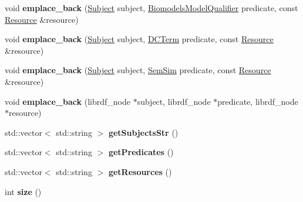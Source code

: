 \begin{DoxyCompactItemize}
\item 
\mbox{\label{classsemsim_1_1Triples_a7a7839f22cac425a78e6b4c95fa7d423}} 
void {\bfseries emplace\+\_\+back} (\hyperlink{classsemsim_1_1Subject}{Subject} subject, \hyperlink{classsemsim_1_1BiomodelsModelQualifier}{Biomodels\+Model\+Qualifier} predicate, const \hyperlink{classsemsim_1_1Resource}{Resource} \&resource)
\item 
\mbox{\label{classsemsim_1_1Triples_a83049cf0e93d420a318bd041ec5410fb}} 
void {\bfseries emplace\+\_\+back} (\hyperlink{classsemsim_1_1Subject}{Subject} subject, \hyperlink{classsemsim_1_1DCTerm}{D\+C\+Term} predicate, const \hyperlink{classsemsim_1_1Resource}{Resource} \&resource)
\item 
\mbox{\label{classsemsim_1_1Triples_aceaa9df401907b19d286ae8be29a4ed1}} 
void {\bfseries emplace\+\_\+back} (\hyperlink{classsemsim_1_1Subject}{Subject} subject, \hyperlink{classsemsim_1_1SemSim}{Sem\+Sim} predicate, const \hyperlink{classsemsim_1_1Resource}{Resource} \&resource)
\item 
\mbox{\label{classsemsim_1_1Triples_a0cdb24ded3d2c8bcec95a41cfd8f14ec}} 
void {\bfseries emplace\+\_\+back} (librdf\+\_\+node $\ast$subject, librdf\+\_\+node $\ast$predicate, librdf\+\_\+node $\ast$resource)
\item 
\mbox{\label{classsemsim_1_1Triples_a95177537847688d33f83302a65767982}} 
std\+::vector$<$ std\+::string $>$ {\bfseries get\+Subjects\+Str} ()
\item 
\mbox{\label{classsemsim_1_1Triples_aa51480fb718cd5b47a2c96fc99a10c2c}} 
std\+::vector$<$ std\+::string $>$ {\bfseries get\+Predicates} ()
\item 
\mbox{\label{classsemsim_1_1Triples_ae4e47c0881214aec04987fada026f9ae}} 
std\+::vector$<$ std\+::string $>$ {\bfseries get\+Resources} ()
\item 
\mbox{\label{classsemsim_1_1Triples_a9787be0290ba6519cc4f71b28ce280f6}} 
int {\bfseries size} ()
\item 
\mbox{\label{classsemsim_1_1Triples_a7c107f7dd600189cff1b0abf6bdd5e72}} 

\end{DoxyCompactItemize}
